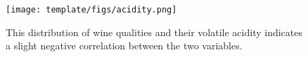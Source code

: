 \begin{figure}[htb]

  \centering  %

  \texttt{[image: template/figs/acidity.png]}

  \caption{This distribution of wine qualities and their volatile acidity indicates a slight negative correlation between the two variables.}

  \label{fig:acidity}

\end{figure}

